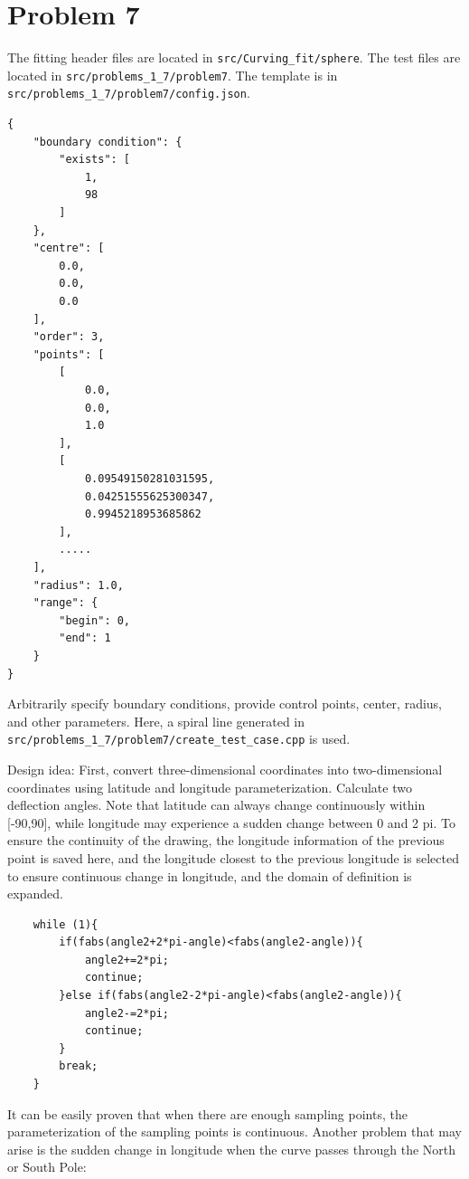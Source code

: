 \documentclass[a4paper]{article}
\begin{document}
\section*{Problem 7}

The fitting header files are located in \texttt{src/Curving\_fit/sphere}.
The test files are located in \texttt{src/problems\_1\_7/problem7}.
The template is in \texttt{src/problems\_1\_7/problem7/config.json}.

\begin{verbatim}
{
    "boundary condition": {
        "exists": [
            1,
            98
        ]
    },
    "centre": [
        0.0,
        0.0,
        0.0
    ],
    "order": 3,
    "points": [
        [
            0.0,
            0.0,
            1.0
        ],
        [
            0.09549150281031595,
            0.04251555625300347,
            0.9945218953685862
        ],
        .....
    ],
    "radius": 1.0,
    "range": {
        "begin": 0,
        "end": 1
    }
}
\end{verbatim}

Arbitrarily specify boundary conditions, provide control points, center, radius, and other parameters.
Here, a spiral line generated in \texttt{src/problems\_1\_7/problem7/create\_test\_case.cpp} is used.

Design idea:
First, convert three-dimensional coordinates into two-dimensional coordinates using latitude and longitude parameterization.
Calculate two deflection angles.
Note that latitude can always change continuously within [-90,90], while longitude may experience a sudden change between 0 and 2 pi. To ensure the continuity of the drawing,
the longitude information of the previous point is saved here, and the longitude closest to the previous longitude is selected to ensure continuous change in longitude, and the domain of definition is expanded.

\begin{verbatim}
    while (1){
        if(fabs(angle2+2*pi-angle)<fabs(angle2-angle)){
            angle2+=2*pi;
            continue;
        }else if(fabs(angle2-2*pi-angle)<fabs(angle2-angle)){
            angle2-=2*pi;
            continue;
        }
        break;
    } 
\end{verbatim}

It can be easily proven that when there are enough sampling points, the parameterization of the sampling points is continuous.
Another problem that may arise is the sudden change in longitude when the curve passes through the North or South Pole:
\end{document}
